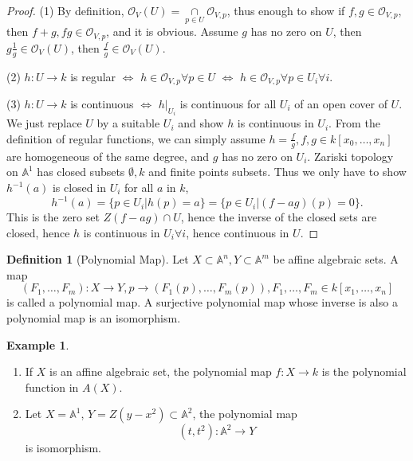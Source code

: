 \documentclass{amsart}
\theoremstyle{plain}
\theoremstyle{definition}
\newtheorem{definition}{Definition}
\newtheorem{example}{Example}
\theoremstyle{remark}
\numberwithin{equation}{section}
\begin{document}
 \begin{proof}
 	(1) By definition, $ \mathcal{O}_V(U)=\mathop{\cap}\limits_{p\in U} \mathcal{O}_{V,p} $, thus enough to show if $ f,g\in \mathcal{O}_{V,p} $, then $ f+g, fg \in \mathcal{O}_{V,p}$, and it is obvious. Assume $ g $ has no zero on $ U $, then $ g\frac{1}{g}\in \mathcal{O}_V(U) $, then $ \frac{f}{g}\in \mathcal{O}_V(U) $.
 	
 	(2) $ h:U\to k $ is regular $ \Leftrightarrow $ $ h\in \mathcal{O}_{V,p} \forall p\in U$ $ \Leftrightarrow $ $ h\in \mathcal{O}_{V,p} \forall p\in U_i \forall i$.
 	
 	(3) $ h:U\to k  $ is continuous $ \Leftrightarrow $ $ h|_{U_i} $ is continuous for all $ U_i $ of an open cover of $ U $. We just replace $ U $ by a suitable $ U_i $ and show $ h $ is continuous in $ U_i $. From the definition of regular functions, we can simply assume $ h=\frac{f}{g}, f,g\in k[x_0,\dots,x_n] $ are homogeneous of the same degree, and $ g $ has no zero on $ U_i $. Zariski topology on $ \mathbb{A}^1 $ has closed subsets $ \emptyset,k $ and finite points subsets. Thus we only have to show $ h^{-1}(a) $ is closed in $ U_i $ for all $ a $ in $ k $,
 	\begin{equation}
 	h^{-1}(a)=\{ p\in U_i|h(p)=a \}= \{ p\in U_i|(f-ag)(p)=0 \}.
 	\end{equation}
 	This is the zero set $ Z(f-ag)\cap U $, hence the inverse of the closed sets are closed, hence $ h $ is continuous in $ U_i \forall i$, hence continuous in $ U $.
 \end{proof}
 \begin{definition}[Polynomial Map]
 	Let $ X\subset \mathbb{A}^n, Y\subset \mathbb{A}^m $ be affine algebraic sets. A map
 	$$
 	(F_1,\dots,F_m):X\to Y,p\to (F_1(p),\dots,F_m(p)),F_1,\dots,F_m\in k[x_1,\dots,x_n]
 	$$
 	is called a polynomial map. A surjective polynomial map whose inverse is also a polynomial map is an isomorphism.
 \end{definition}
 \begin{example}
 	\begin{enumerate}
 		\item If $ X $ is an affine algebraic set, the polynomial map $ f:X\to k $ is the polynomial function in $ A(X) $.
 		\item Let $ X=\mathbb{A}^1 $, $ Y=Z(y-x^2)\subset \mathbb{A}^2 $, the polynomial map
 		$$
 		(t,t^2):\mathbb{A}^2\to Y
 		$$
 		is isomorphism.
 	\end{enumerate}
 \end{example}
\end{document}
